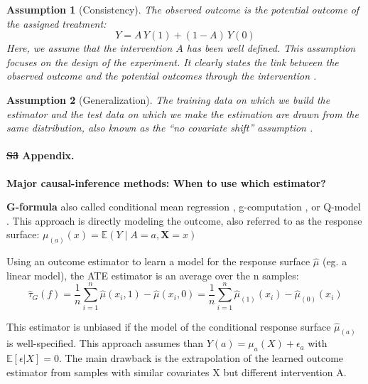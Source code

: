 \documentclass[10pt,letterpaper]{article}
\newtheorem{assumption}{Assumption}
\providecommand{\DIFaddtex}[1]{{\protect\color{blue}\uwave{#1}}} %
\providecommand{\DIFdeltex}[1]{{\protect\color{red}\sout{#1}}}                      %
\providecommand{\DIFaddbegin}{} %
\providecommand{\DIFaddend}{} %
\providecommand{\DIFdelbegin}{} %
\providecommand{\DIFdelend}{} %
\providecommand{\DIFadd}[1]{\texorpdfstring{\DIFaddtex{#1}}{#1}} %
\providecommand{\DIFdel}[1]{\texorpdfstring{\DIFdeltex{#1}}{}} %
\newcommand{\DIFscaledelfig}{0.5}
\newlength{\DIFdelgraphicswidth} %
\newlength{\DIFdelgraphicsheight} %
\newcommand{\DIFaddincludegraphics}[2][]{{\color{blue}\fbox{\DIFOincludegraphics[#1]{#2}}}} %
\newcommand{\DIFdelincludegraphics}[2][]{%
\sbox{\DIFdelgraphicsbox}{\DIFOincludegraphics[#1]{#2}}%
\settoboxwidth{\DIFdelgraphicswidth}{\DIFdelgraphicsbox} %
\settoboxtotalheight{\DIFdelgraphicsheight}{\DIFdelgraphicsbox} %
\scalebox{\DIFscaledelfig}{%
\parbox[b]{\DIFdelgraphicswidth}{\usebox{\DIFdelgraphicsbox}\\[-\baselineskip] \rule{\DIFdelgraphicswidth}{0em}}\llap{\resizebox{\DIFdelgraphicswidth}{\DIFdelgraphicsheight}{%
\setlength{\unitlength}{\DIFdelgraphicswidth}%
\begin{picture}(1,1)%
\thicklines\linethickness{2pt} %
{\color[rgb]{1,0,0}\put(0,0){\framebox(1,1){}}}%
{\color[rgb]{1,0,0}\put(0,0){\line( 1,1){1}}}%
{\color[rgb]{1,0,0}\put(0,1){\line(1,-1){1}}}%
\end{picture}%
}\hspace*{3pt}}} %
} %
\DeclareRobustCommand{\DIFaddbegin}{\DIFOaddbegin \let\includegraphics\DIFaddincludegraphics} %
\DeclareRobustCommand{\DIFaddend}{\DIFOaddend \let\includegraphics\DIFOincludegraphics} %
\DeclareRobustCommand{\DIFdelbegin}{\DIFOdelbegin \let\includegraphics\DIFdelincludegraphics} %
\DeclareRobustCommand{\DIFdelend}{\DIFOaddend \let\includegraphics\DIFOincludegraphics} %
\begin{document}

\begin{assumption}[Consistency]\label{assumption:consistency} The observed
  outcome is the potential outcome of the assigned treatment:
  \begin{equation}\label{eq:consistancy}
    Y = A \, Y(1) + (1-A) \, Y(0)
  \end{equation}
  Here, we assume that the intervention $A$ has been well defined. This
  assumption focuses on the design of the experiment. It clearly states the link
  between the observed outcome and the potential outcomes through the
  intervention \cite{hernan2020causal}.
\end{assumption}

\begin{assumption}[Generalization]\label{assumption:generalization} The training
  data on which we build the estimator and the test data on which we make the
  estimation are drawn from the same distribution, also known as
  the ``no covariate shift'' assumption \cite{jesson2020identifying}.
\end{assumption}
\clearpage



\paragraph*{\DIFdelbegin \DIFdel{S3 }\DIFdelend \DIFaddbegin \DIFadd{S2 }\DIFaddend Appendix.}
\label{apd:causal_estimators}
{\bf Major causal-inference methods: When to use which estimator?}


\textbf{G-formula} also called conditional mean regression
\cite{wendling2018comparing}, g-computation \cite{robins1986role}, or
Q-model \cite{snowden2011implementation}. This approach is directly modeling
the outcome, also referred to as the response surface: $\mu_{(a)}(x)
  =\mathbb{E}\left(Y \mid A=a, \mathbf{X}=x\right)$

Using an outcome estimator to learn a model for the response surface $\hat
  \mu$ (eg. a linear model), the ATE estimator is an average over the n samples:
\begin{equation}
  \hat{\tau}_G(f) = \frac{1}{n} \sum_{i=1}^n \hat \mu(x_i, 1) - \hat \mu(x_i, 0) = \frac{1}{n} \sum_{i=1}^n \hat \mu_{(1)}(x_i) - \hat \mu_{(0)}(x_i)
\end{equation}

This estimator is unbiased if the model of the conditional response surface
$\hat \mu_{(a)}$ is well-specified. This approach assumes than $Y(a) =
  \mu_a(X) + \epsilon_a$ with $\mathbb E[\epsilon|X] = 0$. The main drawback is
the extrapolation of the learned outcome estimator from samples with similar
covariates X but different intervention A.\\
\end{document}

